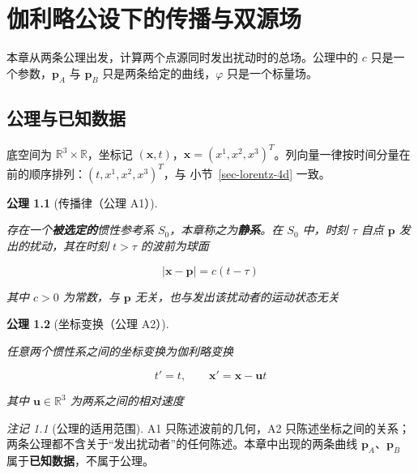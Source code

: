 \documentclass[
  chinese,
  a4paper,
  UTF8,
  12pt,
  oneside,
  openany]{ctexbook}
\theoremstyle{plain}
\theoremstyle{plain}
\newtheorem{conjecture}{公理}[chapter]
\theoremstyle{plain}
\theoremstyle{definition}
\theoremstyle{plain}
\theoremstyle{plain}
\theoremstyle{remark}
\newtheorem{refremark}{注记}[chapter]
\begin{document}

\chapter{伽利略公设下的传播与双源场}\label{sec-two-source-field}

本章从两条公理出发，计算两个点源同时发出扰动时的总场。公理中的 \(c\)
只是一个参数，\(\mathbf{p}_{A}\) 与 \(\mathbf{p}_{B}\)
只是两条给定的曲线，\(\varphi\) 只是一个标量场。

\section{公理与已知数据}\label{sec-tsf-setup}

底空间为 \(\mathbb{R}^{3}\times\mathbb{R}\)，坐标记
\((\mathbf{x},t)\)，\(\mathbf{x}=(x^{1},x^{2},x^{3})^{T}\)。列向量一律按时间分量在前的顺序排列：\((t,x^{1},x^{2},x^{3})^{T}\)，与
小节~\ref{sec-lorentz-4d} 一致。

\begin{conjecture}[传播律（公理
A1）]\protect\hypertarget{cnj-propagation}{}\label{cnj-propagation}

存在一个\textbf{被选定的}惯性参考系
\(S_{0}\)，本章称之为\textbf{静系}。在 \(S_{0}\) 中，时刻 \(\tau\) 自点
\(\mathbf{p}\) 发出的扰动，其在时刻 \(t>\tau\) 的波前为球面

\[
|\mathbf{x}-\mathbf{p}|=c(t-\tau)
\]

其中 \(c>0\) 为常数，与 \(\mathbf{p}\)
无关，也与发出该扰动者的运动状态无关

\end{conjecture}

\begin{conjecture}[坐标变换（公理
A2）]\protect\hypertarget{cnj-galilei-transform}{}\label{cnj-galilei-transform}

任意两个惯性系之间的坐标变换为伽利略变换

\[
t'=t,\qquad \mathbf{x}'=\mathbf{x}-\mathbf{u}t
\]

其中 \(\mathbf{u}\in\mathbb{R}^{3}\) 为两系之间的相对速度

\end{conjecture}

\begin{refremark}[公理的适用范围]
A1 只陈述波前的几何，A2
只陈述坐标之间的关系；两条公理都不含关于``发出扰动者''的任何陈述。本章中出现的两条曲线
\(\mathbf{p}_{A}\)、\(\mathbf{p}_{B}\)
属于\textbf{已知数据}，不属于公理。

\label{rem-axiom-scope}

\end{refremark}
\end{document}
